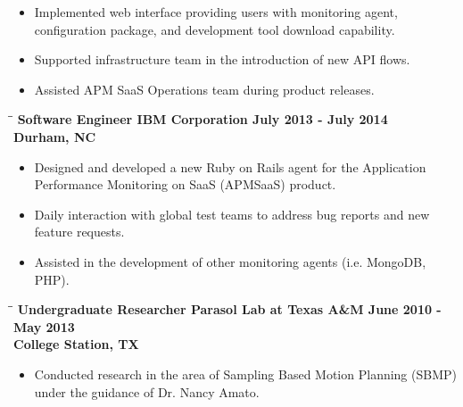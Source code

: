 \documentclass[8pt]{res}
\begin{document}
\begin{resume}
\begin{itemize}
      \item Implemented web interface providing users with monitoring agent, configuration package, and development tool download capability.
      \item Supported infrastructure team in the introduction of new API flows.
      \item Assisted APM SaaS Operations team during product releases.
    \end{itemize}\vspace{-18pt}      %
    \begin{tabbing}
      \hspace{2.3in}\= \hspace{2.6in}\= \kill %
      \bf Software Engineer \>\bf IBM Corporation \>\bf July 2013 - July 2014\\ \>\bf Durham, NC
    \end{tabbing}\vspace{-10pt}      %
    \begin{itemize}
      \item Designed and developed a new Ruby on Rails agent for the Application Performance Monitoring on SaaS (APMSaaS) product.
      \item Daily interaction with global test teams to address bug reports and new feature requests.
      \item Assisted in the development of other monitoring agents (i.e. MongoDB, PHP).
    \end{itemize}\vspace{-18pt}      %
    \begin{tabbing}
      \hspace{2.3in}\= \hspace{2.6in}\= \kill %
      \bf Undergraduate Researcher \>\bf Parasol Lab at Texas A\&M \>\bf June 2010 - May 2013\\ \>\bf College Station, TX
    \end{tabbing}\vspace{-10pt}      %
    \begin{itemize}
      \item Conducted research in the area of Sampling Based Motion Planning (SBMP) under the guidance of Dr. Nancy Amato.

\end{itemize}
\end{resume}
\end{document}
